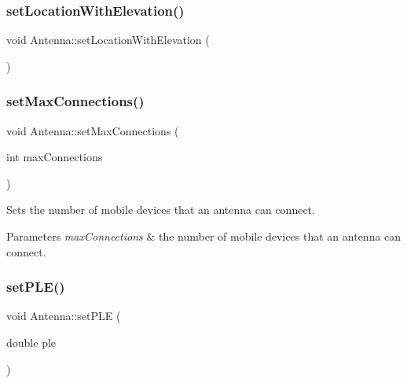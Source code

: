 \mbox{\label{class_antenna_a4b1d0ae147826e553a044fd481d6c7e0}} 
\subsubsection{\texorpdfstring{set\+Location\+With\+Elevation()}{setLocationWithElevation()}}
{\footnotesize\ttfamily void Antenna\+::set\+Location\+With\+Elevation (\begin{DoxyParamCaption}{ }\end{DoxyParamCaption})\hspace{0.3cm}{\ttfamily [private]}}

\mbox{\label{class_antenna_ad844ed8507afb83b74b804c2434a4e50}} 
\subsubsection{\texorpdfstring{set\+Max\+Connections()}{setMaxConnections()}}
{\footnotesize\ttfamily void Antenna\+::set\+Max\+Connections (\begin{DoxyParamCaption}\item[{int}]{max\+Connections }\end{DoxyParamCaption})}

Sets the number of mobile devices that an antenna can connect. 
\begin{DoxyParams}{Parameters}
{\em max\+Connections} & the number of mobile devices that an antenna can connect. \\
\hline
\end{DoxyParams}
\mbox{\label{class_antenna_ac0724f137d8e0af08d30ce2d07e6aa87}} 
\subsubsection{\texorpdfstring{set\+P\+L\+E()}{setPLE()}}
{\footnotesize\ttfamily void Antenna\+::set\+P\+LE (\begin{DoxyParamCaption}\item[{double}]{ple }\end{DoxyParamCaption})}

